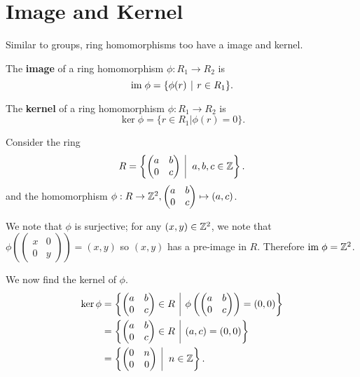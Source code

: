 \section{Image and Kernel}
Similar to groups, ring homomorphisms too have a image and kernel.
\begin{definition}
    The \textbf{image} of a ring homomorphism $\phi: R_1 \to R_2$ is
    \[
        \im\phi = \{\phi(r) \vert r \in R_1\}.
    \]
\end{definition}
\begin{definition}
    The \textbf{kernel} of a ring homomorphism $\phi:R_1 \to R_2$ is
    \[
        \ker\phi = \{r \in R_1 \vert \phi(r) = 0\}.
    \]
\end{definition}

\begin{example}\label{example-homomorphism-on-upper-triangle-matrices}
    Consider the ring
    \[
        R = \left\{\begin{pmatrix}a&b\\0&c\end{pmatrix}\vert a,b,c\in\Z\right\}.
    \]
    and the homomorphism $\phi: R \to \mathbb{Z}^2, \begin{pmatrix}a&b\\0&c\end{pmatrix} \mapsto (a,c)$.

    We note that $\phi$ is surjective; for any $(x,y)\in\mathbb{Z}^2$, we note that $\phi\left(\begin{pmatrix}x&0\\0&y\end{pmatrix}\right) = (x,y)$ so $(x,y)$ has a pre-image in $R$. Therefore $\mathrm{im}\; \phi = \mathbb{Z}^2$.

    We now find the kernel of $\phi$.
    \begin{align*}
        \ker\phi &= \left\{\begin{pmatrix}a&b\\0&c\end{pmatrix} \in R \vert \phi\left(\begin{pmatrix}a&b\\0&c\end{pmatrix}\right) = (0,0)\right\}\\
        &= \left\{\begin{pmatrix}a&b\\0&c\end{pmatrix} \in R \vert (a,c) = (0,0)\right\}\\
        &= \left\{\begin{pmatrix}0&n\\0&0\end{pmatrix} \vert n \in \Z\right\}.
    \end{align*}
\end{example}

